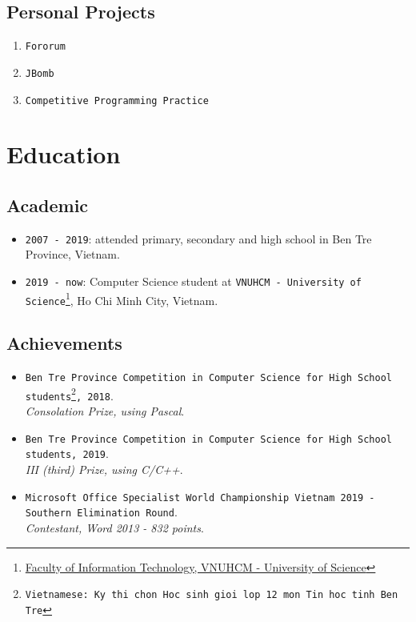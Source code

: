\documentclass{article}
\begin{document}
       \subsection{Personal Projects}
           \begin{enumerate}
               \item \texttt{Fororum}\cite{fororum}
               \item \texttt{JBomb}\cite{jbomb}
               \item \texttt{Competitive Programming Practice}\cite{cpp}
           \end{enumerate}

    \section{Education}
        \subsection{Academic}
            \begin{itemize}
                \item {\texttt{2007 - 2019}}:
                attended primary, secondary and high school in Ben Tre Province, Vietnam.
                \item {\texttt{2019 - now}}: Computer Science student at \texttt{VNUHCM - University of Science}\footnote{\href{https://www.fit.hcmus.edu.vn}{Faculty of Information Technology, VNUHCM - University of Science}}, Ho Chi Minh City, Vietnam.
            \end{itemize}

        \subsection{Achievements}
            \begin{itemize}
                \item \texttt{Ben Tre Province Competition in Computer Science for High School students\footnote{Vietnamese: Ky thi chon Hoc sinh gioi lop 12 mon Tin hoc tinh Ben Tre}, 2018}.\\
                \textit{Consolation Prize, using Pascal}.

                \item \texttt{Ben Tre Province Competition in Computer Science for High School students, 2019}.\\
                \textit{III (third) Prize, using C/C++}.

                \item \texttt{Microsoft Office Specialist World Championship Vietnam 2019 - Southern Elimination Round}.\\
                \textit{Contestant, Word 2013 - 832 points}.
            \end{itemize}
\end{document}

